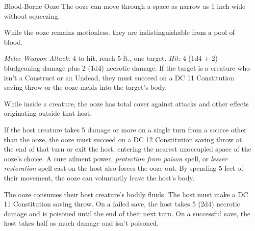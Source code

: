 \documentclass[10pt,a4paper,twoside,bg=print,twocolumn,openany,nodeprecatedcode]{dndbook}
\begin{document}
\begin{DndMonster}[float=t]{Blood-Borne Ooze}
\DndMonsterBasics[
armor-class = {13 (natural armor)},
hit-points = {\DndDice{4d4 + 4}},
speed = {20 ft.}
]
\DndMonsterAbilityScores[
 str = 8,
 dex = 15,
 con = 13,
 int = 1,
 wis = 10,
 cha = 2
]
\DndMonsterDetails[
skills = {Stealth +4},
condition-immunities = {blinded, charmed, deafened, exhaustion, flanked, prone},
senses = {blindsight 60 ft. (blind beyond this radius), passive perception 10},
challenge = 1/4,
]
The ooze can move through a space as narrow as 1 inch wide without squeezing.

While the ooze remains motionless, they are indistinguishable from a pool of blood.

\textsl{Melee Weapon Attack:} 4 to hit, reach 5 ft., one target. \textsl{Hit:} 4 (1d4 + 2) bludgeoning damage plus 2 (1d4) necrotic damage. If the target is a creature who isn't a Construct or an Undead, they must succeed on a DC 11 Constitution saving throw or the ooze melds into the target's body.

While inside a creature, the ooze has total cover against attacks and other effects originating outside that host.

If the host creature takes 5 damage or more on a single turn from a source other than the ooze, the ooze must succeed on a DC 12 Constitution saving throw at the end of that turn or exit the host, entering the nearest unoccupied space of the ooze's choice. A cure ailment power, \textit{protection from poison} spell, or \textit{lesser restoration} spell cast on the host also forces the ooze out. By spending 5 feet of their movement, the ooze can voluntarily leave the host's body.

The ooze consumes their host creature's bodily fluids. The host must make a DC 11 Constitution saving throw. On a failed save, the host takes 5 (2d4) necrotic damage and is poisoned until the end of their next turn. On a successful save, the host takes half as much damage and isn't poisoned.

\end{DndMonster}
\end{document}
